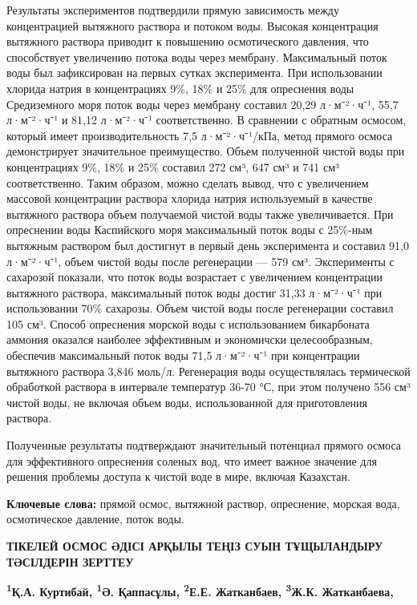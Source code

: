 Результаты экспериментов подтвердили прямую зависимость между
концентрацией вытяжного раствора и потоком воды. Высокая концентрация
вытяжного раствора приводит к повышению осмотического давления, что
способствует увеличению потока воды через мембрану. Максимальный поток
воды был зафиксирован на первых сутках эксперимента. При использовании
хлорида натрия в концентрациях 9\%, 18\% и 25\% для опреснения воды
Средиземного моря поток воды через мембрану составил 20,29 л·м⁻²·ч⁻¹,
55,7 л·м⁻²·ч⁻¹ и 81,12 л·м⁻²·ч⁻¹ соответственно. В сравнении с обратным
осмосом, который имеет производительность 7,5 л·м⁻²·ч⁻¹/кПа, метод
прямого осмоса демонстрирует значительное преимущество. Объем полученной
чистой воды при концентрациях 9\%, 18\% и 25\% составил 272 см³, 647 см³
и 741 см³ соответственно. Таким образом, можно сделать вывод, что с
увеличением массовой концентрации раствора хлорида натрия используемый в
качестве вытяжного раствора объем получаемой чистой воды также
увеличивается. При опреснении воды Каспийского моря максимальный поток
воды с 25\%-ным вытяжным раствором был достигнут в первый день
эксперимента и составил 91,0 л·м⁻²·ч⁻¹, объем чистой воды после
регенерации --- 579 см³. Эксперименты с сахарозой показали, что поток
воды возрастает с увеличением концентрации вытяжного раствора,
максимальный поток воды достиг 31,33 л·м⁻²·ч⁻¹ при использовании 70\%
сахарозы. Объем чистой воды после регенерации составил 105 см³. Способ
опреснения морской воды с использованием бикарбоната аммония оказался
наиболее эффективным и экономичски целесообразным, обеспечив
максимальный поток воды 71,5 л·м⁻²·ч⁻¹ при концентрации вытяжного
раствора 3,846 моль/л. Регенерация воды осуществлялась термической
обработкой раствора в интервале температур 36-70 °С, при этом получено
556 см³ чистой воды, не включая объем воды, использованной для
приготовления раствора.

Полученные результаты подтверждают значительный потенциал прямого осмоса
для эффективного опреснения соленых вод, что имеет важное значение для
решения проблемы доступа к чистой воде в мире, включая Казахстан.

{\bfseries Ключевые слова:} прямой осмос, вытяжной раствор, опреснение,
морская вода, осмотическое давление, поток воды.

{\bfseries ТІКЕЛЕЙ ОСМОС ӘДІСІ АРҚЫЛЫ ТЕҢІЗ СУЫН ТҰЩЫЛАНДЫРУ ТӘСІЛДЕРІН
ЗЕРТТЕУ}

{\bfseries \textsuperscript{1}Қ.А. Куртибай}\textsuperscript{\envelope }{\bfseries ,
\textsuperscript{1}Ә. Қаппасұлы, \textsuperscript{2}Е.Е. Жатканбаев,
\textsuperscript{3}Ж.К. Жатканбаева,}

